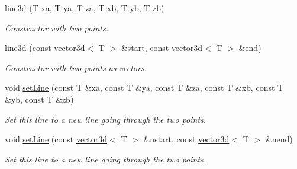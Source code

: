 \begin{DoxyCompactItemize}
\hyperlink{classirr_1_1core_1_1line3d_a19bc6c5661d8913ac6911b2513f7804f}{line3d} (T xa, T ya, T za, T xb, T yb, T zb)
\begin{DoxyCompactList}\small\item\em Constructor with two points. \end{DoxyCompactList}\item 
\mbox{\label{classirr_1_1core_1_1line3d_a9f77afda569d38afe68c9c3db39037f4}} 
\hyperlink{classirr_1_1core_1_1line3d_a9f77afda569d38afe68c9c3db39037f4}{line3d} (const \hyperlink{classirr_1_1core_1_1vector3d}{vector3d}$<$ T $>$ \&\hyperlink{classirr_1_1core_1_1line3d_a6b7683c8ac164e209b195fc439269a1b}{start}, const \hyperlink{classirr_1_1core_1_1vector3d}{vector3d}$<$ T $>$ \&\hyperlink{classirr_1_1core_1_1line3d_a49cd73380569e7e6958369520fe1b7bf}{end})
\begin{DoxyCompactList}\small\item\em Constructor with two points as vectors. \end{DoxyCompactList}\item 
\mbox{\label{classirr_1_1core_1_1line3d_aa691426799bff0ccf37bc09f56b8fa59}} 
void \hyperlink{classirr_1_1core_1_1line3d_aa691426799bff0ccf37bc09f56b8fa59}{set\+Line} (const T \&xa, const T \&ya, const T \&za, const T \&xb, const T \&yb, const T \&zb)
\begin{DoxyCompactList}\small\item\em Set this line to a new line going through the two points. \end{DoxyCompactList}\item 
\mbox{\label{classirr_1_1core_1_1line3d_af66862d06acc114567e1e0cfaa23f429}} 
void \hyperlink{classirr_1_1core_1_1line3d_af66862d06acc114567e1e0cfaa23f429}{set\+Line} (const \hyperlink{classirr_1_1core_1_1vector3d}{vector3d}$<$ T $>$ \&nstart, const \hyperlink{classirr_1_1core_1_1vector3d}{vector3d}$<$ T $>$ \&nend)
\begin{DoxyCompactList}\small\item\em Set this line to a new line going through the two points. \end{DoxyCompactList}\item 
\mbox{\label{classirr_1_1core_1_1line3d_a75d2a9f34ca66c2a1399f8b9fe0fa760}} 

\end{DoxyCompactItemize}
